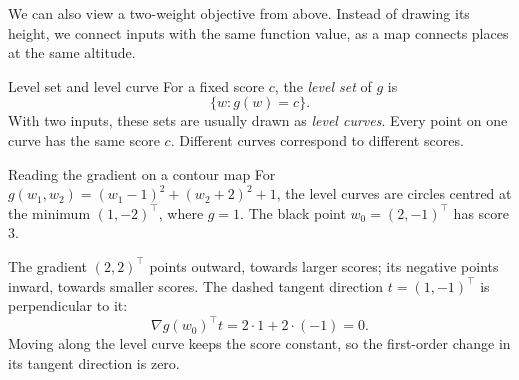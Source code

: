 \documentclass[a4paper,12pt,oneside]{report}
\begin{document}
We can also view a two-weight objective from above. Instead of
drawing its height, we connect inputs with the same function value,
as a map connects places at the same altitude.

\begin{frameddefn}{Level set and level curve}\label{def:level-set}
For a fixed score $c$, the \emph{level set} of $g$ is
\[
  \{w:g(w)=c\}.
\]
With two inputs, these sets are usually drawn as \emph{level curves}.
Every point on one curve has the same score $c$. Different curves
correspond to different scores.
\end{frameddefn}

\begin{framedexample}{Reading the gradient on a contour map}
For $g(w_1,w_2)=(w_1-1)^2+(w_2+2)^2+1$, the level curves are
circles centred at the minimum $(1,-2)^\top$, where $g=1$.
The black point $w_0=(2,-1)^\top$ has score $3$.

\begin{center}
\end{center}

The gradient $(2,2)^\top$ points outward, towards larger scores;
its negative points inward, towards smaller scores.
The dashed tangent direction $t=(1,-1)^\top$ is perpendicular to it:
\[
  \nabla g(w_0)^\top t=2\cdot1+2\cdot(-1)=0.
\]
Moving along the level curve keeps the score constant, so the
first-order change in its tangent direction is zero.
\end{framedexample}
\end{document}
